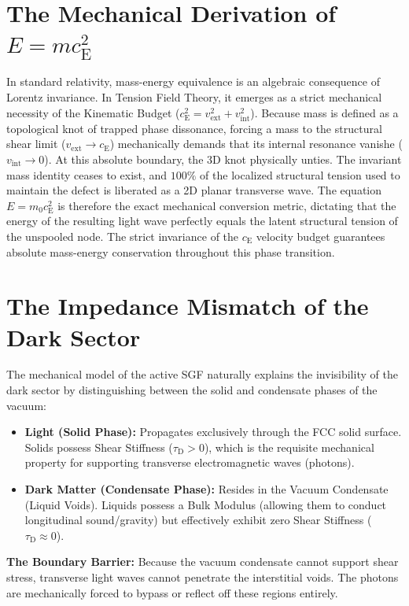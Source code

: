 \section{The Mechanical Derivation of $E = m c_{\mathrm{E}}^2$}
In standard relativity, mass-energy equivalence is an algebraic consequence of Lorentz invariance. In Tension Field Theory, it emerges as a strict mechanical necessity of the Kinematic Budget ($c_{\mathrm{E}}^2 = v_{\mathrm{ext}}^2 + v_{\mathrm{int}}^2$). Because mass is defined as a topological knot of trapped phase dissonance, forcing a mass to the structural shear limit ($v_{\mathrm{ext}} \to c_{\mathrm{E}}$) mechanically demands that its internal resonance vanishe ($v_{\mathrm{int}} \to 0$). At this absolute boundary, the 3D knot physically unties. The invariant mass identity ceases to exist, and $100\%$ of the localized structural tension used to maintain the defect is liberated as a 2D planar transverse wave. The equation $E = m_0 c_{\mathrm{E}}^2$ is therefore the exact mechanical conversion metric, dictating that the energy of the resulting light wave perfectly equals the latent structural tension of the unspooled node. The strict invariance of the $c_{\mathrm{E}}$ velocity budget guarantees absolute mass-energy conservation throughout this phase transition.

\section{The Impedance Mismatch of the Dark Sector}
\label{sec:impedance_mismatch}
The mechanical model of the active SGF naturally explains the invisibility of the dark sector by distinguishing between the solid and condensate phases of the vacuum:

\begin{itemize}
    \item \textbf{Light (Solid Phase):} Propagates exclusively through the FCC solid surface. Solids possess Shear Stiffness ($\tau_{\mathrm{D}} > 0$), which is the requisite mechanical property for supporting transverse electromagnetic waves (photons).
    \item \textbf{Dark Matter (Condensate Phase):} Resides in the Vacuum Condensate (Liquid Voids). Liquids possess a Bulk Modulus (allowing them to conduct longitudinal sound/gravity) but effectively exhibit zero Shear Stiffness ($\tau_{\mathrm{D}} \approx 0$).
\end{itemize}

\vspace{0.3em}
\noindent \textbf{The Boundary Barrier:} Because the vacuum condensate cannot support shear stress, transverse light waves cannot penetrate the interstitial voids. The photons are mechanically forced to bypass or reflect off these regions entirely.

